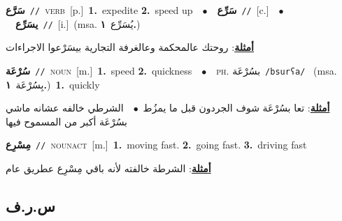 \documentclass[10pt,a4paper,twoside]{article} %
\begin{document}
\begin{multicols}{2}
{\setlength\topsep{0pt}\textbf{\foreignlanguage{arabic}{سَرَّع}}\ {\color{gray}\texttt{//}\color{black}}\ \textsc{verb}\ [p.]\ \textbf{1.}~expedite  \textbf{2.}~speed up\ \ $\bullet$\ \ \setlength\topsep{0pt}\textbf{\foreignlanguage{arabic}{سَرِّع}}\ {\color{gray}\texttt{//}\color{black}}\ [c.]\ \ $\bullet$\ \ \setlength\topsep{0pt}\textbf{\foreignlanguage{arabic}{يسَرِّع}}\ {\color{gray}\texttt{//}\color{black}}\ [i.]\ \color{gray}(msa. \foreignlanguage{arabic}{يُسَرِّع}~\foreignlanguage{arabic}{\textbf{١.}})\color{black}\  \begin{flushright}\color{gray}\foreignlanguage{arabic}{\textbf{\underline{\foreignlanguage{arabic}{أمثلة}}}: روحتك عالمحكمة وعالغرفة التجارية بيسَرْعوا الاجراءات}\end{flushright}\color{black}} \vspace{2mm}

{\setlength\topsep{0pt}\textbf{\foreignlanguage{arabic}{سُرْعَة}}\ {\color{gray}\texttt{//}\color{black}}\ \textsc{noun}\ [m.]\ \textbf{1.}~speed  \textbf{2.}~quickness\ \ $\bullet$\ \ \textsc{ph.} \color{gray} \foreignlanguage{arabic}{بسُرْعَة}\color{black}\ {\color{gray}\texttt{/{\sffamily bsurʕa}/}\color{black}}\ \color{gray} (msa. \foreignlanguage{arabic}{بِسُرْعَة}~\foreignlanguage{arabic}{\textbf{١.}})\color{black}\ \textbf{1.}~quickly\  \begin{flushright}\color{gray}\foreignlanguage{arabic}{\textbf{\underline{\foreignlanguage{arabic}{أمثلة}}}: تعا بسُرْعَة شوف الجردون قبل ما يمزُط\ $\bullet$\ \  الشرطي خالفه عشانه ماشي بسُرْعَة أكبر من المسموح فيها}\end{flushright}\color{black}} \vspace{2mm}

{\setlength\topsep{0pt}\textbf{\foreignlanguage{arabic}{مِسْرِع}}\ {\color{gray}\texttt{//}\color{black}}\ \textsc{noun\textunderscore act}\ [m.]\ \textbf{1.}~moving fast.  \textbf{2.}~going fast.  \textbf{3.}~driving fast\  \begin{flushright}\color{gray}\foreignlanguage{arabic}{\textbf{\underline{\foreignlanguage{arabic}{أمثلة}}}: الشرطة خالفته لأنه باقي مِسْرِع عطريق عام}\end{flushright}\color{black}} \vspace{2mm}

\vspace{-3mm}
\subsection*{\color{blue}\foreignlanguage{arabic}{س.ر.ف}\color{blue}{}} 


\end{multicols}
\end{document}

